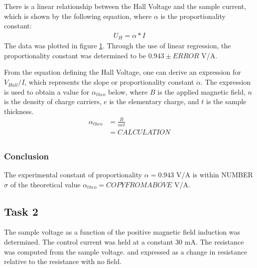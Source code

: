 \documentclass[a4paper]{article}
\begin{document}
There is a linear relationship between the Hall Voltage and the sample 
current, which is shown by the following equation, where $\alpha$ is
the proportionality constant:
\begin{align*}
U_H = \alpha * I
\end{align*}
The data was plotted in figure \ref{task21plot}. Through the use of linear regression, the proportionality constant was determined to be $0.943 \pm ERROR$ V/A. 

\begin{figure}[H]
\centering
\label{task21plot}
\end{figure}

From the equation defining the Hall Voltage, one can derive an expression for $V_{Hall}/I$, which represents the slope or proportionality constant $\alpha$. The expression is used to obtain a value for $\alpha_{theo}$ below, where $B$ is the applied magnetic field, $n$ is the density of charge carriers, $e$ is the elementary charge, and $t$ is the sample thickness.
\begin{align*}
\alpha_{theo} &= \frac{B}{net} \\
			  &= CALCULATION \\
\end{align*}

\subsubsection{Conclusion}
The experimental constant of proportionality $\alpha = 0.943 $ V/A is within NUMBER $\sigma$ of the theoretical value $\alpha_{theo} = COPYFROMABOVE$ V/A.

\subsection{Task 2}

\qq The sample voltage as a function of the positive magnetic field
induction was determined. The control current was held at a constant
30 mA. The resistance was computed from the sample voltage. and expressed as a change in resistance relative to the resistance with no field.
\end{document}
